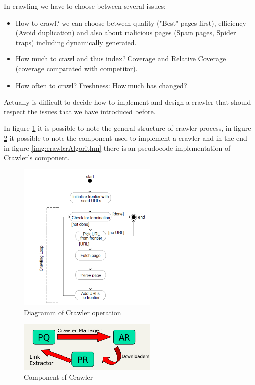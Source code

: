 In crawling we have to choose between several issues:
\begin{itemize}
    \item How to crawl? we can choose between quality ("Best" pages first), efficiency (Avoid duplication) and also 
          about malicious pages (Spam pages, Spider traps) including dynamically generated.
    \item How much to crawl and thus index? Coverage and Relative Coverage (coverage comparated with competitor).
    \item How often to crawl? Freshness: How much has changed?
\end{itemize}
Actually is difficult to decide how to implement and design a crawler that should respect the issues that we have
introduced before.

In figure \ref{img:crawler} it is possible to note the general structure of crawler process, in figure \ref{img:crawlerElement} it 
possible to note the component used to implement a crawler and in the end in figure \ref{img:crawlerAlgorithm} there is an pseudocode 
implementation of Crawler's component.

\begin{figure}
    \includegraphics[width=0.6\textwidth]{Images/crawler}
    \caption {Diagramm of Crawler operation}
    \label{img:crawler}
\end{figure}

\begin{figure}
    \includegraphics[width=0.6\textwidth]{Images/crawlerComponents}
    \caption{Component of Crawler}
    \label{img:crawlerElement}
\end{figure}

